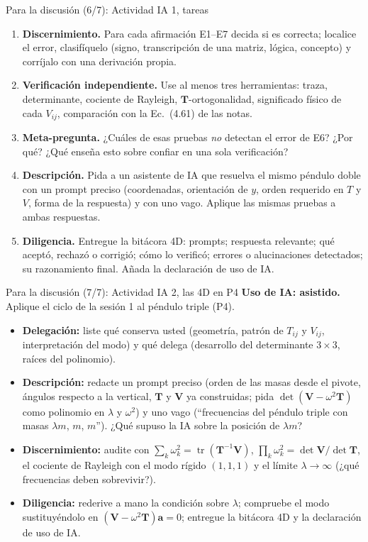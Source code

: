 \documentclass[spanish]{beamer}
\newcommand{\Tm}{\mathbf{T}}              %
\newcommand{\Vm}{\mathbf{V}}              %
\newcommand{\ba}{\boldsymbol{a}}          %
\newcommand{\IA}[1]{\textcolor{blue!60!black}{\textbf{#1}}}
\begin{document}
\begin{frame}{Para la discusión (6/7): Actividad IA 1, tareas}
\small
\begin{enumerate}
\item<1-> \textbf{Discernimiento.} Para cada afirmación E1--E7 decida si es correcta; localice el error, clasifíquelo (signo, transcripción de una matriz, lógica, concepto) y corríjalo con una derivación propia.
\item<2-> \textbf{Verificación independiente.} Use al menos tres herramientas: traza, determinante, cociente de Rayleigh, $\Tm$-ortogonalidad, significado físico de cada $V_{ij}$, comparación con la Ec.~(4.61) de las notas.
\item<3-> \textbf{Meta-pregunta.} ¿Cuáles de esas pruebas \emph{no} detectan el error de E6? ¿Por qué? ¿Qué enseña esto sobre confiar en una sola verificación?
\item<4-> \textbf{Descripción.} Pida a un asistente de IA que resuelva el mismo péndulo doble con un prompt preciso (coordenadas, orientación de $y$, orden requerido en $T$ y $V$, forma de la respuesta) y con uno vago. Aplique las mismas pruebas a ambas respuestas.
\item<5-> \textbf{Diligencia.} Entregue la bitácora 4D: prompts; respuesta relevante; qué aceptó, rechazó o corrigió; cómo lo verificó; errores o alucinaciones detectados; su razonamiento final. Añada la declaración de uso de IA.
\end{enumerate}
\end{frame}

\begin{frame}{Para la discusión (7/7): Actividad IA 2, las 4D en P4}
\IA{Uso de IA: asistido.} Aplique el ciclo de la sesión 1 al péndulo triple (P4).
\small
\begin{itemize}
\item<1-> \textbf{Delegación:} liste qué conserva usted (geometría, patrón de $T_{ij}$ y $V_{ij}$, interpretación del modo) y qué delega (desarrollo del determinante $3\times3$, raíces del polinomio).
\item<2-> \textbf{Descripción:} redacte un prompt preciso (orden de las masas desde el pivote, ángulos respecto a la vertical, $\Tm$ y $\Vm$ ya construidas; pida $\det(\Vm-\omega^2\Tm)$ como polinomio en $\lambda$ y $\omega^2$) y uno vago (``frecuencias del péndulo triple con masas $\lambda m$, $m$, $m$''). ¿Qué supuso la IA sobre la posición de $\lambda m$?
\item<3-> \textbf{Discernimiento:} audite con $\sum_k\omega_k^2=\operatorname{tr}(\Tm^{-1}\Vm)$, $\prod_k\omega_k^2=\det\Vm/\det\Tm$, el cociente de Rayleigh con el modo rígido $(1,1,1)$ y el límite $\lambda\to\infty$ (¿qué frecuencias deben sobrevivir?).
\item<4-> \textbf{Diligencia:} rederive a mano la condición sobre $\lambda$; compruebe el modo sustituyéndolo en $(\Vm-\omega^2\Tm)\ba=0$; entregue la bitácora 4D y la declaración de uso de IA.
\end{itemize}
\end{frame}
\end{document}
